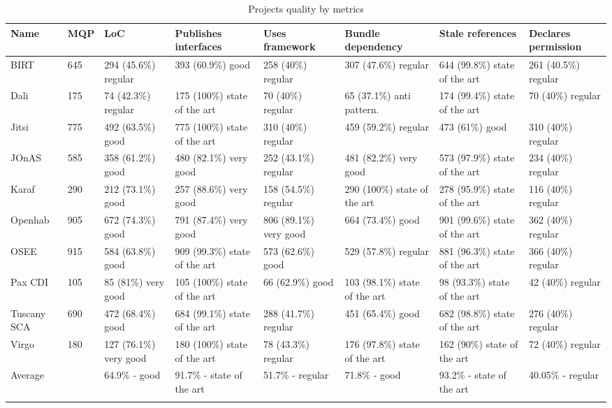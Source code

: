 \begin{table}[h]
\tiny
\caption{Projects quality by metrics}
\label{projects-metrics-quality}
    \begin{tabular}{  p{} | p{} | p{2cm} | p{2cm} | p{2cm} | p{2cm} | p{2cm} | p{} }
    \Xhline{2\arrayrulewidth}
    Name & MQP & LoC & Publishes interfaces & Uses framework & Bundle dependency & Stale references & Declares permission \\  \hline
    BIRT & 645 & 294 (45.6\%) regular & 393 (60.9\%) good& 258 (40\%) regular& 307 (47.6\%) regular& 644 (99.8\%) state of the art & 261 (40.5\%) regular\\ \hline
    Dali & 175 & 74 (42.3\%) regular & 175 (100\%) state of the art& 70 (40\%) regular & 65 (37.1\%) anti pattern. & 174 (99.4\%) state of the art& 70 (40\%) regular\\ \hline
    Jitsi & 775 & 492 (63.5\%) good & 775 (100\%) state of the art& 310 (40\%) regular& 459 (59.2\%) regular& 473 (61\%) good& 310 (40\%) regular\\ \hline
    JOnAS & 585 & 358 (61.2\%) good & 480 (82.1\%) very good& 252 (43.1\%) regular& 481 (82.2\%) very good& 573 (97.9\%) state of the art& 234 (40\%) regular\\ \hline
    Karaf & 290 & 212 (73.1\%) good & 257 (88.6\%) very good& 158 (54.5\%) regular&  290 (100\%) state of the art& 278 (95.9\%) state of the art& 116 (40\%) regular\\ \hline
    Openhab & 905 & 672 (74.3\%) good& 791 (87.4\%) very good& 806 (89.1\%) very good&  664 (73.4\%) good& 901 (99.6\%) state of the art& 362 (40\%) regular\\ \hline
    OSEE & 915 & 584 (63.8\%) good& 909 (99.3\%) state of the art& 573 (62.6\%) good& 529 (57.8\%) regular& 881 (96.3\%) state of the art& 366 (40\%) regular\\ \hline
    Pax CDI & 105 & 85 (81\%) very good & 105 (100\%) state of the art & 66 (62.9\%) good& 103 (98.1\%) state of the art & 98 (93.3\%) state of the art& 42 (40\%) regular\\ \hline
    Tuscany SCA & 690 & 472 (68.4\%) good& 684 (99.1\%) state of the art & 288 (41.7\%) regular& 451 (65.4\%) good&  682 (98.8\%) state of the art& 276 (40\%) regular\\ \hline
    Virgo & 180 & 127 (76.1\%) very good& 180 (100\%) state of the art & 78 (43.3\%) regular & 176 (97.8\%) state of the art& 162 (90\%) state of the art & 72 (40\%) regular\\ \hline
    Average  & & 64.9\% - good & 91.7\% - state of the art & 51.7\% - regular  & 71.8\% - good & 93.2\% - state of the art & 40.05\% - regular\\
   \Xhline{2\arrayrulewidth}
    \end{tabular}
\end{table}
\FloatBarrier   

